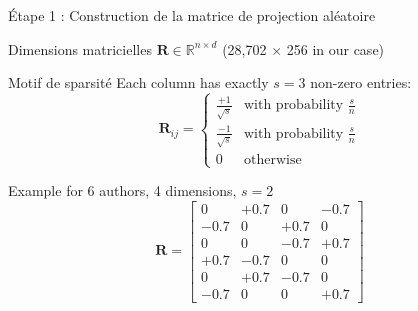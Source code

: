 \documentclass[9pt,aspectratio=169,professionalfonts]{beamer}
\begin{document}
\begin{frame}{Étape 1 : Construction de la matrice de projection aléatoire}
\begin{block}{Dimensions matricielles}
$\mathbf{R} \in \mathbb{R}^{n \times d}$ (28,702 $\times$ 256 in our case)
\end{block}

\begin{block}{Motif de sparsité}
Each column has exactly $s=3$ non-zero entries:
$$\mathbf{R}_{ij} = \begin{cases}
\frac{+1}{\sqrt{s}} & \text{with probability } \frac{s}{n} \\
\frac{-1}{\sqrt{s}} & \text{with probability } \frac{s}{n} \\
0 & \text{otherwise}
\end{cases}$$
\end{block}

\begin{exampleblock}{Example for 6 authors, 4 dimensions, $s=2$}
$$\mathbf{R} = \begin{bmatrix}
0 & +0.7 & 0 & -0.7 \\
-0.7 & 0 & +0.7 & 0 \\
0 & 0 & -0.7 & +0.7 \\
+0.7 & -0.7 & 0 & 0 \\
0 & +0.7 & -0.7 & 0 \\
-0.7 & 0 & 0 & +0.7
\end{bmatrix}$$
\end{exampleblock}
\end{frame}
\end{document}
